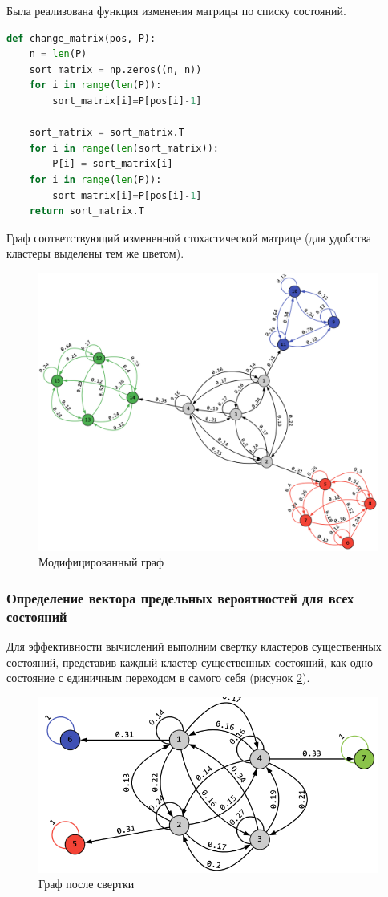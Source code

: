 Была реализована функция изменения матрицы по списку состояний.
 \begin{lstlisting}[language=python, label=prog, caption={\textit{Модификация матрицы}}]
def change_matrix(pos, P):
    n = len(P)
    sort_matrix = np.zeros((n, n))
    for i in range(len(P)):
        sort_matrix[i]=P[pos[i]-1]

    sort_matrix = sort_matrix.T
    for i in range(len(sort_matrix)):
        P[i] = sort_matrix[i]
    for i in range(len(P)):
        sort_matrix[i]=P[pos[i]-1]
    return sort_matrix.T
\end{lstlisting}

Граф соответствующий измененной стохастической матрице (для удобства кластеры выделены тем же цветом).

\begin{figure}[H]
\centerline{\includegraphics[width=0.8\columnwidth]{Images/2.png}}
\caption{Модифицированный граф}
\label{graph}
\end{figure}


\subsubsection{Определение вектора предельных вероятностей для всех состояний}
Для эффективности вычислений выполним свертку кластеров существенных состояний, представив каждый кластер существенных состояний,
как одно состояние с единичным переходом в самого себя (рисунок \ref{sver_gr}).

\begin{figure}[H]
\centerline{\includegraphics[width=0.7\columnwidth]{Images/3.png}}
\caption{Граф после свертки}
\label{sver_gr}
\end{figure}

